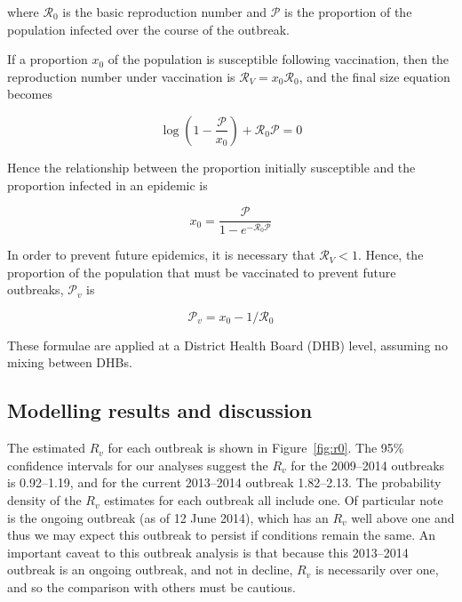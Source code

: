 \documentclass{article}
\newcommand{\Pe}{\mathcal{P}}
\newcommand{\Ro}{\mathcal{R}_0}
\newcommand{\Pv}{\mathcal{P}_v}
\newcommand{\Rr}{\mathcal{R}}
\begin{document}
where $\Ro$ is the basic reproduction number and $\Pe$ is the proportion of the population infected over the course of the outbreak.

If a proportion $x_0$ of the population is susceptible following vaccination, then the  reproduction number under vaccination is $\Rr_V=x_0\Ro$, and the final size equation becomes

\begin{equation} \label{eq:eqn2}
\log\left(1-\frac{\Pe}{x_0}\right)+\Ro\Pe=0
\end{equation}

Hence the relationship between the proportion initially susceptible and the proportion infected in an epidemic is

\begin{equation} \label{eq:eqn3}
x_0=\frac{\Pe}{1-e^{-\Ro\Pe}}
\end{equation}

In order to prevent future epidemics, it is necessary that $\Rr_V<1$. Hence, the proportion of the population that must be vaccinated to prevent future outbreaks, $\Pv$ is

\begin{equation} \label{eq:prop}
\Pv = x_0-1/\Ro
\end{equation}

These formulae are applied at a District Health Board (DHB) level, assuming no mixing between DHBs.

\subsection{Modelling results and discussion}

The estimated $R_v$ for each outbreak is shown in Figure~\autoref{fig:r0}. The 95\% confidence intervals for our analyses suggest the $R_v$ for the 2009--2014 outbreaks is 0.92--1.19, and for the current 2013--2014 outbreak 1.82--2.13. The probability density of the $R_v$ estimates for each outbreak all include one. Of particular note is the ongoing outbreak (as of 12 June 2014), which has an $R_v$ well above one and thus we may expect this outbreak to persist if conditions remain the same. An important caveat to this outbreak analysis is that because this 2013--2014 outbreak is an ongoing outbreak, and not in decline, $R_v$ is necessarily over one, and so the comparison with others must be cautious.
\end{document}
